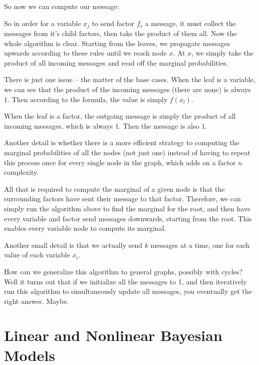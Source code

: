 \documentclass[12pt]{article}
\begin{document}
So now we can compute our message: 


So in order for a variable $x_j$ to send factor $f_s$ a message, it must collect the messages from it's child factors, then take the product of them all. Now the whole algorithm is clear. Starting from the leaves, we propagate messages upwards according to these rules until we reach node $x$. At $x$, we simply take the product of all incoming messages and read off the marginal probabilities.

There is just one issue -- the matter of the base cases. When the leaf is a variable, we can see that the product of the incoming messages (there are none) is always 1. Then according to the formula, the value is simply $f(x_l)$.

When the leaf is a factor, the outgoing message is simply the product of all incoming messages, which is always 1. Then the message is also 1.

Another detail is whether there is a more efficient strategy to computing the marginal probabilities of all the nodes (not just one) instead of having to repeat this process once for every single node in the graph, which adds on a factor $n$ complexity.

All that is required to compute the marginal of a given node is that the surrounding factors have sent their message to that factor. Therefore, we can simply run the algorithm above to find the marginal for the root, and then have every variable and factor send messages downwards, starting from the root. This enables every variable node to compute its marginal.

Another small detail is that we actually send $k$ messages at a time, one for each value of each variable $x_i$. 

How can we generalize this algorithm to general graphs, possibly with cycles? Well it turns out that if we initialize all the messages to 1, and then iteratively run this algorithm to simultaneously update all messages, you eventually get the right answer. Maybe. 

\section{Linear and Nonlinear Bayesian Models}
\end{document}
